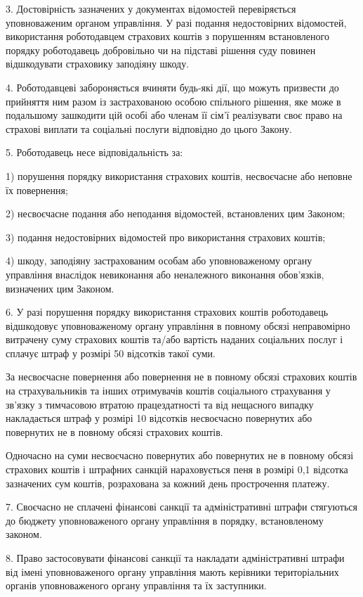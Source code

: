 3. Достовірність зазначених у документах відомостей перевіряється уповноваженим органом управління. У разі подання недостовірних відомостей, використання роботодавцем страхових коштів з порушенням встановленого порядку роботодавець добровільно чи на підставі рішення суду повинен відшкодувати страховику заподіяну шкоду.

4. Роботодавцеві забороняється вчиняти будь-які дії, що можуть призвести до прийняття ним разом із застрахованою особою спільного рішення, яке може в подальшому зашкодити цій особі або членам її сім’ї реалізувати своє право на страхові виплати та соціальні послуги відповідно до цього Закону.

5. Роботодавець несе відповідальність за:

1) порушення порядку використання страхових коштів, несвоєчасне або неповне їх повернення;

2) несвоєчасне подання або неподання відомостей, встановлених цим Законом;

3) подання недостовірних відомостей про використання страхових коштів;

4) шкоду, заподіяну застрахованим особам або уповноваженому органу управління внаслідок невиконання або неналежного виконання обов’язків, визначених цим Законом.

6. У разі порушення порядку використання страхових коштів роботодавець відшкодовує уповноваженому органу управління в повному обсязі неправомірно витрачену суму страхових коштів та/або вартість наданих соціальних послуг і сплачує штраф у розмірі 50 відсотків такої суми.

За несвоєчасне повернення або повернення не в повному обсязі страхових коштів на страхувальників та інших отримувачів коштів соціального страхування у зв’язку з тимчасовою втратою працездатності та від нещасного випадку накладається штраф у розмірі 10 відсотків несвоєчасно повернутих або повернутих не в повному обсязі страхових коштів.

Одночасно на суми несвоєчасно повернутих або повернутих не в повному обсязі страхових коштів і штрафних санкцій нараховується пеня в розмірі 0,1 відсотка зазначених сум коштів, розрахована за кожний день прострочення платежу.

7. Своєчасно не сплачені фінансові санкції та адміністративні штрафи стягуються до бюджету уповноваженого органу управління в порядку, встановленому законом.

8. Право застосовувати фінансові санкції та накладати адміністративні штрафи від імені уповноваженого органу управління мають керівники територіальних органів уповноваженого органу управління та їх заступники.